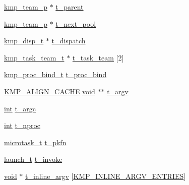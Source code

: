 \begin{DoxyCompactItemize}
\hyperlink{kmp_8h_a2d72bf7a856130c6d2324db6367179a8}{kmp\-\_\-team\-\_\-p} $\ast$ \hyperlink{structkmp__base__team_a89a8b8d8f8291f69ab6fdab0d811f6ad}{t\-\_\-parent}
\item 
\hyperlink{kmp_8h_a2d72bf7a856130c6d2324db6367179a8}{kmp\-\_\-team\-\_\-p} $\ast$ \hyperlink{structkmp__base__team_a7d4909be691ca96c74445fa3bfd75ff2}{t\-\_\-next\-\_\-pool}
\item 
\hyperlink{kmp_8h_a125b055d611c51e55aa0b0819c1a5f33}{kmp\-\_\-disp\-\_\-t} $\ast$ \hyperlink{structkmp__base__team_ae5827b6641abfc165ff01c861a5abf4d}{t\-\_\-dispatch}
\item 
\hyperlink{kmp_8h_a1570ef2f4a50702c1be60039e4f5e605}{kmp\-\_\-task\-\_\-team\-\_\-t} $\ast$ \hyperlink{structkmp__base__team_a46a00f88fcd8f41d394023df0d5f354b}{t\-\_\-task\-\_\-team} \mbox{[}2\mbox{]}
\item 
\hyperlink{kmp_8h_ae587debf3f0331e4f824daa05f47a241}{kmp\-\_\-proc\-\_\-bind\-\_\-t} \hyperlink{structkmp__base__team_a33becbb653f837bc684f18a9757b5f63}{t\-\_\-proc\-\_\-bind}
\item 
\hyperlink{kmp__os_8h_a6830c178a3906c25cd0138d8365db070}{K\-M\-P\-\_\-\-A\-L\-I\-G\-N\-\_\-\-C\-A\-C\-H\-E} \hyperlink{ittnotify__static_8h_af941d56e55e3c5465135b60c4d6343ed}{void} $\ast$$\ast$ \hyperlink{structkmp__base__team_a3c73e14c4ca69f5ffc8b8f07d22eca8f}{t\-\_\-argv}
\item 
\hyperlink{ittnotify__static_8h_a8b8dcd723308a8cb5d84277c7a3fff70}{int} \hyperlink{structkmp__base__team_acb73515747b762604405fcbee3686477}{t\-\_\-argc}
\item 
\hyperlink{ittnotify__static_8h_a8b8dcd723308a8cb5d84277c7a3fff70}{int} \hyperlink{structkmp__base__team_aa3a50b68eb22e0e1e54862b5778b3339}{t\-\_\-nproc}
\item 
\hyperlink{kmp__os_8h_a390eabec74d95ed005fb6979992598c8}{microtask\-\_\-t} \hyperlink{structkmp__base__team_ae4257d7bf56803599fd7b5db1848dfc2}{t\-\_\-pkfn}
\item 
\hyperlink{kmp_8h_a850b6d220ac7bc7284cfe27996d78e98}{launch\-\_\-t} \hyperlink{structkmp__base__team_a1adf2c475f7b5486c1dff23a4f48c2e2}{t\-\_\-invoke}
\item 
\hyperlink{ittnotify__static_8h_af941d56e55e3c5465135b60c4d6343ed}{void} $\ast$ \hyperlink{structkmp__base__team_a43f00716c5f187830f607bbb53db6510}{t\-\_\-inline\-\_\-argv} \mbox{[}\hyperlink{kmp_8h_ad7c5e393cb16fe8c2db3e08a0ce11393}{K\-M\-P\-\_\-\-I\-N\-L\-I\-N\-E\-\_\-\-A\-R\-G\-V\-\_\-\-E\-N\-T\-R\-I\-E\-S}\mbox{]}
\item 
$$
\end{DoxyCompactItemize}

